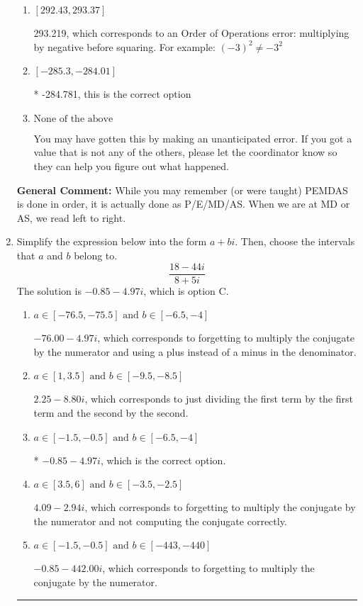 \documentclass{extbook}[14pt]
\newcommand{\litem}[1]{\item #1

\rule{\textwidth}{0.4pt}}
\begin{document}
\begin{enumerate}
{\begin{enumerate}[label=\Alph*.]
 292.007, which corresponds to two Order of Operations errors.
\item \( [292.43, 293.37] \)

 293.219, which corresponds to an Order of Operations error: multiplying by negative before squaring. For example: $(-3)^2 \neq -3^2$
\item \( [-285.3, -284.01] \)

* -284.781, this is the correct option
\item \( \text{None of the above} \)

 You may have gotten this by making an unanticipated error. If you got a value that is not any of the others, please let the coordinator know so they can help you figure out what happened.
\end{enumerate}

\textbf{General Comment:} While you may remember (or were taught) PEMDAS is done in order, it is actually done as P/E/MD/AS. When we are at MD or AS, we read left to right.
}
\litem{
Simplify the expression below into the form $a+bi$. Then, choose the intervals that $a$ and $b$ belong to.
\[ \frac{18 - 44 i}{8 + 5 i} \]The solution is \( -0.85  - 4.97 i \), which is option C.\begin{enumerate}[label=\Alph*.]
\item \( a \in [-76.5, -75.5] \text{ and } b \in [-6.5, -4] \)

 $-76.00  - 4.97 i$, which corresponds to forgetting to multiply the conjugate by the numerator and using a plus instead of a minus in the denominator.
\item \( a \in [1, 3.5] \text{ and } b \in [-9.5, -8.5] \)

 $2.25  - 8.80 i$, which corresponds to just dividing the first term by the first term and the second by the second.
\item \( a \in [-1.5, -0.5] \text{ and } b \in [-6.5, -4] \)

* $-0.85  - 4.97 i$, which is the correct option.
\item \( a \in [3.5, 6] \text{ and } b \in [-3.5, -2.5] \)

 $4.09  - 2.94 i$, which corresponds to forgetting to multiply the conjugate by the numerator and not computing the conjugate correctly.
\item \( a \in [-1.5, -0.5] \text{ and } b \in [-443, -440] \)

 $-0.85  - 442.00 i$, which corresponds to forgetting to multiply the conjugate by the numerator.
\end{enumerate}

}
\end{enumerate}
\end{document}
